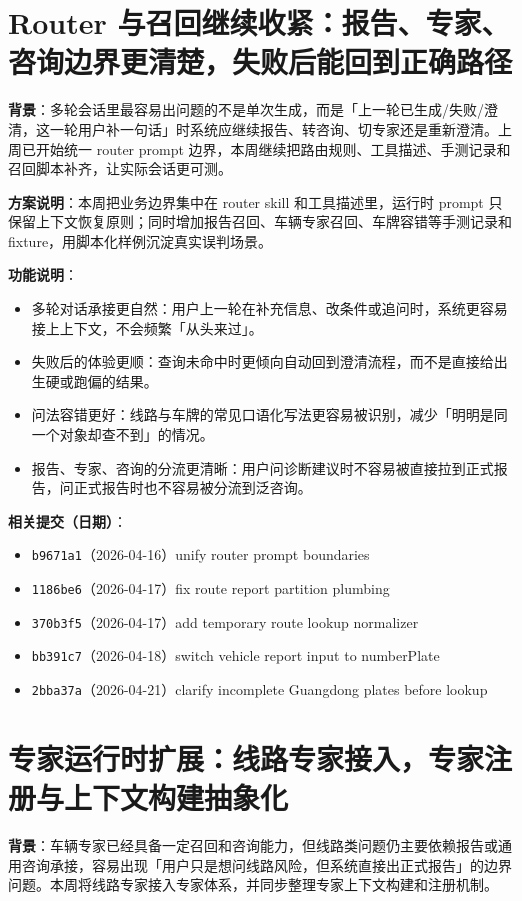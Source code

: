 \documentclass[UTF8]{ctexart}
\begin{document}
\section{Router 与召回继续收紧：报告、专家、咨询边界更清楚，失败后能回到正确路径}

\textbf{背景}：多轮会话里最容易出问题的不是单次生成，而是「上一轮已生成/失败/澄清，这一轮用户补一句话」时系统应继续报告、转咨询、切专家还是重新澄清。上周已开始统一 router prompt 边界，本周继续把路由规则、工具描述、手测记录和召回脚本补齐，让实际会话更可测。

\textbf{方案说明}：本周把业务边界集中在 router skill 和工具描述里，运行时 prompt 只保留上下文恢复原则；同时增加报告召回、车辆专家召回、车牌容错等手测记录和 fixture，用脚本化样例沉淀真实误判场景。

\textbf{功能说明}：
\begin{itemize}
\item 多轮对话承接更自然：用户上一轮在补充信息、改条件或追问时，系统更容易接上上下文，不会频繁「从头来过」。
\item 失败后的体验更顺：查询未命中时更倾向自动回到澄清流程，而不是直接给出生硬或跑偏的结果。
\item 问法容错更好：线路与车牌的常见口语化写法更容易被识别，减少「明明是同一个对象却查不到」的情况。
\item 报告、专家、咨询的分流更清晰：用户问诊断建议时不容易被直接拉到正式报告，问正式报告时也不容易被分流到泛咨询。
\end{itemize}

\textbf{相关提交（日期）}：
\begin{itemize}
\item \texttt{b9671a1}（2026-04-16）unify router prompt boundaries
\item \texttt{1186be6}（2026-04-17）fix route report partition plumbing
\item \texttt{370b3f5}（2026-04-17）add temporary route lookup normalizer
\item \texttt{bb391c7}（2026-04-18）switch vehicle report input to numberPlate
\item \texttt{2bba37a}（2026-04-21）clarify incomplete Guangdong plates before lookup
\end{itemize}

\section{专家运行时扩展：线路专家接入，专家注册与上下文构建抽象化}

\textbf{背景}：车辆专家已经具备一定召回和咨询能力，但线路类问题仍主要依赖报告或通用咨询承接，容易出现「用户只是想问线路风险，但系统直接出正式报告」的边界问题。本周将线路专家接入专家体系，并同步整理专家上下文构建和注册机制。
\end{document}
